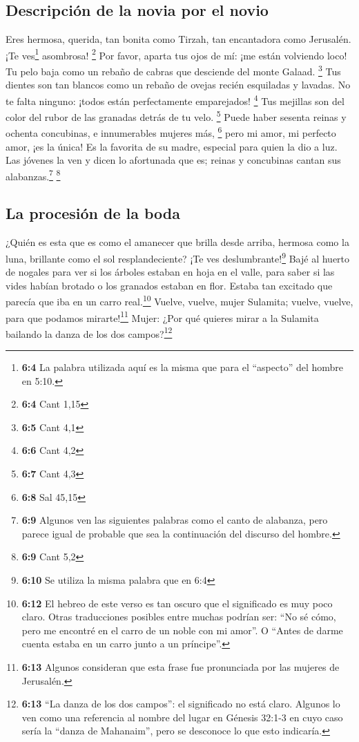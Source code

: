 \hypertarget{descripciuxf3n-de-la-novia-por-el-novio-1}{%
\subsection{Descripción de la novia por el
novio}\label{descripciuxf3n-de-la-novia-por-el-novio-1}}

 Eres hermosa, querida, tan bonita como Tirzah, tan
encantadora como Jerusalén. ¡Te ves\footnote{\textbf{6:4} La palabra
  utilizada aquí es la misma que para el ``aspecto'' del hombre en 5:10.}
asombrosa! \footnote{\textbf{6:4} Cant 1,15}  Por favor,
aparta tus ojos de mí: ¡me están volviendo loco! Tu pelo baja como un
rebaño de cabras que desciende del monte Galaad. \footnote{\textbf{6:5}
  Cant 4,1}  Tus dientes son tan blancos como un rebaño de
ovejas recién esquiladas y lavadas. No te falta ninguno: ¡todos están
perfectamente emparejados! \footnote{\textbf{6:6} Cant 4,2}
 Tus mejillas son del color del rubor de las granadas
detrás de tu velo. \footnote{\textbf{6:7} Cant 4,3}  Puede
haber sesenta reinas y ochenta concubinas, e innumerables mujeres más,
\footnote{\textbf{6:8} Sal 45,15}  pero mi amor, mi
perfecto amor, ¡es la única! Es la favorita de su madre, especial para
quien la dio a luz. Las jóvenes la ven y dicen lo afortunada que es;
reinas y concubinas cantan sus alabanzas.\footnote{\textbf{6:9} Algunos
  ven las siguientes palabras como el canto de alabanza, pero parece
  igual de probable que sea la continuación del discurso del hombre.}
\footnote{\textbf{6:9} Cant 5,2}

\hypertarget{la-procesiuxf3n-de-la-boda}{%
\subsection{La procesión de la boda}\label{la-procesiuxf3n-de-la-boda}}

 ¿Quién es esta que es como el amanecer que brilla desde
arriba, hermosa como la luna, brillante como el sol resplandeciente? ¡Te
ves deslumbrante!\footnote{\textbf{6:10} Se utiliza la misma palabra que
  en 6:4}  Bajé al huerto de nogales para ver si los
árboles estaban en hoja en el valle, para saber si las vides habían
brotado o los granados estaban en flor.  Estaba tan
excitado que parecía que iba en un carro real.\footnote{\textbf{6:12} El
  hebreo de este verso es tan oscuro que el significado es muy poco
  claro. Otras traducciones posibles entre muchas podrían ser: ``No sé
  cómo, pero me encontré en el carro de un noble con mi amor''. O
  ``Antes de darme cuenta estaba en un carro junto a un príncipe''.}
 Vuelve, vuelve, mujer Sulamita; vuelve, vuelve, para que
podamos mirarte!\footnote{\textbf{6:13} Algunos consideran que esta
  frase fue pronunciada por las mujeres de Jerusalén.} Mujer: ¿Por qué
quieres mirar a la Sulamita bailando la danza de los dos
campos?\footnote{\textbf{6:13} ``La danza de los dos campos'': el
  significado no está claro. Algunos lo ven como una referencia al
  nombre del lugar en Génesis 32:1-3 en cuyo caso sería la ``danza de
  Mahanaim'', pero se desconoce lo que esto indicaría.}


